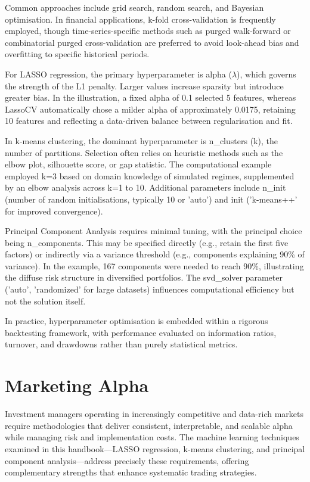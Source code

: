\documentclass[11pt,a4paper]{article}
\begin{document}
Common approaches include grid search, random search, and Bayesian optimisation. In financial applications, k-fold cross-validation is frequently employed, though time-series-specific methods such as purged walk-forward or combinatorial purged cross-validation are preferred to avoid look-ahead bias and overfitting to specific historical periods.

For LASSO regression, the primary hyperparameter is alpha ($\lambda$), which governs the strength of the L1 penalty. Larger values increase sparsity but introduce greater bias. In the illustration, a fixed alpha of 0.1 selected 5 features, whereas LassoCV automatically chose a milder alpha of approximately 0.0175, retaining 10 features and reflecting a data-driven balance between regularisation and fit.

In k-means clustering, the dominant hyperparameter is n\_clusters (k), the number of partitions. Selection often relies on heuristic methods such as the elbow plot, silhouette score, or gap statistic. The computational example employed k=3 based on domain knowledge of simulated regimes, supplemented by an elbow analysis across k=1 to 10. Additional parameters include n\_init (number of random initialisations, typically 10 or 'auto') and init ('k-means++' for improved convergence).

Principal Component Analysis requires minimal tuning, with the principal choice being n\_components. This may be specified directly (e.g., retain the first five factors) or indirectly via a variance threshold (e.g., components explaining 90\% of variance). In the example, 167 components were needed to reach 90\%, illustrating the diffuse risk structure in diversified portfolios. The svd\_solver parameter ('auto', 'randomized' for large datasets) influences computational efficiency but not the solution itself.

In practice, hyperparameter optimisation is embedded within a rigorous backtesting framework, with performance evaluated on information ratios, turnover, and drawdowns rather than purely statistical metrics.

\section{Marketing Alpha}
Investment managers operating in increasingly competitive and data-rich markets require methodologies that deliver consistent, interpretable, and scalable alpha while managing risk and implementation costs. The machine learning techniques examined in this handbook—LASSO regression, k-means clustering, and principal component analysis—address precisely these requirements, offering complementary strengths that enhance systematic trading strategies.
\end{document}
